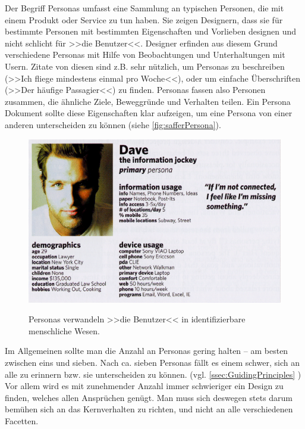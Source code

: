 Der Begriff Personas umfasst eine Sammlung an typischen Personen, die mit einem Produkt oder Service zu tun haben. Sie zeigen Designern, dass sie für bestimmte Personen mit bestimmten Eigenschaften und Vorlieben designen und nicht schlicht für >>die Benutzer<<. 
Designer erfinden aus diesem Grund verschiedene Personas mit Hilfe von Beobachtungen und Unterhaltungen mit Usern. Zitate von diesen sind z.B. sehr nützlich, um Personas zu beschreiben (>>Ich fliege mindestens einmal pro Woche<<), oder um einfache Überschriften (>>Der häufige Passagier<<) zu finden. Personas fassen also Personen zusammen, die ähnliche Ziele, Beweggründe und Verhalten teilen. Ein Persona Dokument sollte diese Eigenschaften klar aufzeigen, um eine Persona von einer anderen unterscheiden zu können (siehe \autoref{fig:safferPersona}).

\begin{figure}
	\begin{center}
        {\includegraphics[width=\linewidth]{gfx/safferPersona}}
	\end{center}
		\caption[Persona \newline \citep{Saffer:2007}]{Personas verwandeln >>die Benutzer<< in identifizierbare menschliche Wesen.}\label{fig:safferPersona}
\end{figure}

\medskip Im Allgemeinen sollte man die Anzahl an Personas gering halten – am besten zwischen eins und sieben. Nach ca. sieben Personas fällt es einem schwer, sich an alle zu erinnern bzw. sie unterscheiden zu können. (vgl. \ref{ssec:GuidingPrinciples} ) Vor allem wird es mit zunehmender Anzahl immer schwieriger ein Design zu finden, welches allen Ansprüchen genügt. Man muss sich deswegen stets darum bemühen sich an das Kernverhalten zu richten, und nicht an alle verschiedenen Facetten.

